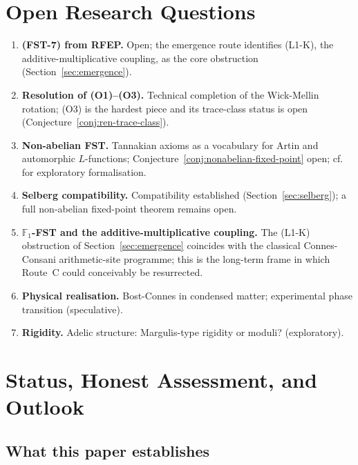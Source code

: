 \documentclass[11pt,a4paper]{article}
\theoremstyle{plain}
\theoremstyle{definition}
\newcommand{\F}{\mathbb{F}}
\begin{document}
\section{Open Research Questions}
\label{sec:ofq}

\begin{enumerate}[label=(OFQ\arabic*),leftmargin=*]
\item \textbf{(FST-7) from RFEP.} Open; the emergence route
  identifies (L1-K), the additive-multiplicative coupling, as the
  core obstruction (Section~\ref{sec:emergence}).
\item \textbf{Resolution of (O1)--(O3).}  Technical
  completion of the Wick-Mellin rotation; (O3) is the hardest piece
  and its trace-class status is open
  (Conjecture~\ref{conj:ren-trace-class}).
\item \textbf{Non-abelian FST.}  Tannakian axioms as a
  vocabulary for Artin and automorphic $L$-functions;
  Conjecture~\ref{conj:nonabelian-fixed-point} open;
  cf.\ \cite{TannakianAxioms} for exploratory formalisation.
\item \textbf{Selberg compatibility.} Compatibility
  established (Section~\ref{sec:selberg}); a full non-abelian
  fixed-point theorem remains open.
\item \textbf{$\F_1$-FST and the additive-multiplicative
  coupling.}  The (L1-K) obstruction of
  Section~\ref{sec:emergence} coincides with the classical
  Connes-Consani arithmetic-site programme; this is the long-term
  frame in which Route~C could conceivably be resurrected.
\item \textbf{Physical realisation.}  Bost-Connes in
  condensed matter; experimental phase transition (speculative).
\item \textbf{Rigidity.}  Adelic structure: Margulis-type
  rigidity or moduli?  (exploratory).
\end{enumerate}

\section{Status, Honest Assessment, and Outlook}
\label{sec:status}

\subsection{What this paper establishes}
\end{document}
